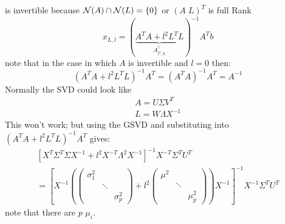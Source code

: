 is invertible because $\mathcal{N}(A) \cap \mathcal{N}(L) = \{0 \}$ or $(A\; L)^T$ is full Rank $$x_{L,l} = (\underbrace{A^TA + l^2L^T L}_{A^\dagger _{l^2,L}}) ^{-1} A^Tb$$
note that in the case in which $A$ is invertible and $l=0$ then:
$$(A^TA + l^2 L^T L)^{-1} A^T =    (A^TA  )^{-1}A^T = A^{-1}$$
Normally the SVD could look like 
\begin{gather*}
A=U\Sigma V^T\\
L=W\Lambda X^{-1}
\end{gather*}
This won't work; but using the GSVD and substituting into $(A^TA + l^2 L^T L)^{-1} A^T$ gives:
\begin{gather*}
\left [ X^T \Sigma^T \Sigma X^{-1} + l^2 X^{-T}\Lambda^2 X^{-1} \right]^{-1}X^{-T} \Sigma^T U^T\\
=\left[X ^{-1} \left( \begin{pmatrix} \sigma_1^2 & & \\ & \ddots & \\ & & \sigma^2_p \end{pmatrix} + l^2 \begin{pmatrix} \mu^2 & & \\ & \ddots & \\ & & \mu^2_p \end{pmatrix}\right) X ^{-1} \right] ^{-1} X ^{-1} \Sigma ^T U^T
\end{gather*}
note that there are $p$ $\mu_i$.
